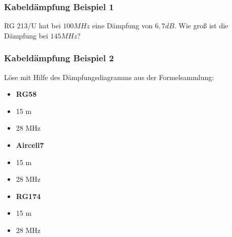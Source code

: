 \begin{frame}
    \frametitle{Kabeldämpfung Beispiel 1}
    
    \begin{exampleblock}{RG 213/U hat bei $100MHz$ eine Dämpfung von $6,7dB$.
                         Wie groß ist die Dämpfung bei $145MHz$?}
    \end{exampleblock}

\end{frame}

\begin{frame}
  \frametitle{Kabeldämpfung Beispiel 2}

  \begin{exampleblock}{Löse mit Hilfe des Dämpfungsdiagramms aus der Formelsammlung:}
    \begin{minipage}{0.3\textwidth}
      \begin{itemize}
        \item \textbf{RG58}\\
        \item 15 m\\
        \item 28 MHz
      \end{itemize}
    \end{minipage}
    \begin{minipage}{0.3\textwidth}
      \begin{itemize}
        \item \textbf{Aircell7}\\
        \item 15 m\\
        \item 28 MHz
      \end{itemize}
    \end{minipage}
    \begin{minipage}{0.3\textwidth}
      \begin{itemize}
        \item \textbf{RG174}\\
        \item 15 m\\
        \item 28 MHz
      \end{itemize}
    \end{minipage}
  \end{exampleblock}
\end{frame}

